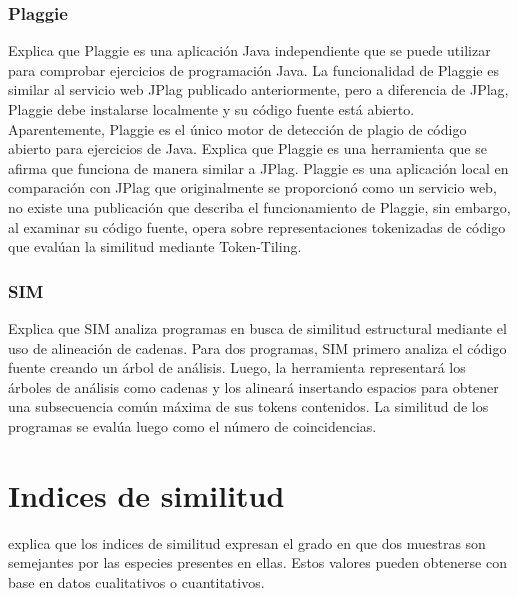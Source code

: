 \subsubsection{Plaggie}
 \cite{Ahtiainen2006} Explica que Plaggie es una aplicación Java independiente que se puede utilizar para comprobar ejercicios de programación Java. La funcionalidad de Plaggie es similar al servicio web JPlag publicado anteriormente, pero a diferencia de JPlag, Plaggie debe instalarse localmente y su código fuente está abierto. Aparentemente, Plaggie es el único motor de detección de plagio de código abierto para ejercicios de Java. \cite{Cheers2021} Explica que Plaggie es una herramienta que se afirma que funciona de manera similar a JPlag. Plaggie es una aplicación local en comparación con JPlag que originalmente se proporcionó como un servicio web, no existe una publicación que describa el funcionamiento de Plaggie, sin embargo, al examinar su código fuente, opera sobre representaciones tokenizadas de código que evalúan la similitud mediante Token-Tiling.
\subsubsection{SIM}
\cite{Cheers2021} Explica que SIM analiza programas en busca de similitud estructural mediante el uso de alineación de cadenas. Para dos programas, SIM primero analiza el código fuente creando un árbol de análisis. Luego, la herramienta representará los árboles de análisis como cadenas y los alineará insertando espacios para obtener una subsecuencia común máxima de sus tokens contenidos. La similitud de los programas se evalúa luego como el número de coincidencias.


\section{Indices de similitud}
\cite{magurran1988} explica que los indices de similitud expresan el grado en que dos muestras son semejantes por las especies presentes en ellas. Estos valores pueden obtenerse con base en datos cualitativos o cuantitativos.

